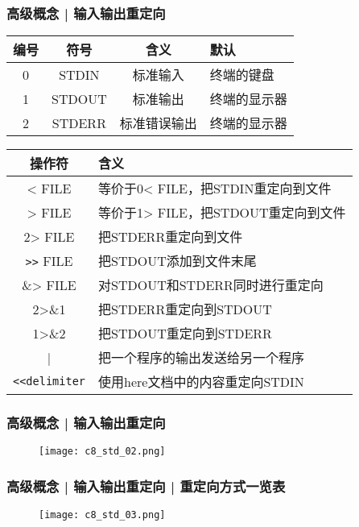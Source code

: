 \begin{frame}[fragile]
  \frametitle{高级概念 | \alert{输入输出重定向}}
  \begin{table}
    \centering
    \begin{tabularx}{0.8\textwidth}{cccX}
      \hline
      \rowcolor{blue!50}编号 & 符号 & 含义 & 默认\\
      \hline
      0 & STDIN & 标准输入 & 终端的键盘\\
      1 & STDOUT & 标准输出 & 终端的显示器\\
      2 & STDERR & 标准错误输出 & 终端的显示器\\
      \hline
    \end{tabularx}
  \end{table}
  \pause
  \begin{table}
    \centering
    \begin{tabularx}{0.9\textwidth}{cX}
      \hline
      \rowcolor{blue!50}操作符 & 含义\\
      \hline
      < FILE & 等价于0< FILE，把STDIN重定向到文件\\
      > FILE & 等价于1> FILE，把STDOUT重定向到文件\\
      2> FILE & 把STDERR重定向到文件\\
      \verb|>>| FILE & 把STDOUT添加到文件末尾\\
      \&> FILE & 对STDOUT和STDERR同时进行重定向\\
      2>\&1 & 把STDERR重定向到STDOUT\\
      1>\&2 & 把STDOUT重定向到STDERR\\
      | & 把一个程序的输出发送给另一个程序\\
      \verb|<<delimiter| & 使用here文档中的内容重定向STDIN\\
      \hline
    \end{tabularx}
  \end{table}
\end{frame}

\begin{frame}
  \frametitle{高级概念 | 输入输出重定向}
  \begin{figure}
    \centering
    \texttt{[image: c8\_std\_02.png]}
  \end{figure}
\end{frame}

\begin{frame}
  \frametitle{高级概念 | 输入输出重定向 | 重定向方式一览表}
  \begin{figure}
    \centering
    \texttt{[image: c8\_std\_03.png]}
  \end{figure}
\end{frame}

